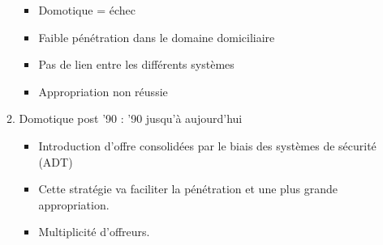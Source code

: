 \documentclass[11pt]{article}
\begin{document}
\begin{enumerate}
\begin{enumerate}
\label{sec:org9bcad8b}
\begin{itemize}
\item Domotique = échec
\item Faible pénétration dans le domaine domiciliaire
\item Pas de lien entre les différents systèmes
\item Appropriation non réussie
\end{itemize}
\item Domotique post '90 : '90 jusqu'à aujourd'hui
\label{sec:orgadbad32}
\begin{itemize}
\item Introduction d'offre consolidées par le biais des systèmes de sécurité (ADT)
\item Cette stratégie va faciliter la pénétration et une plus grande appropriation.
\item Multiplicité d'offreurs.
\end{itemize}
\end{enumerate}
\end{enumerate}
\end{document}
